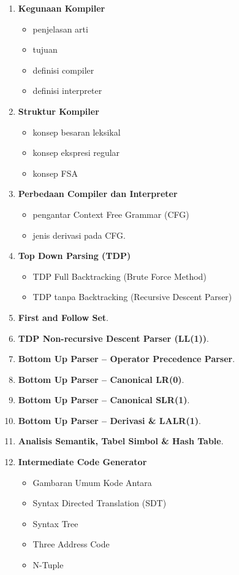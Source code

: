 \begin{enumerate}
  \item \textbf{Kegunaan Kompiler} 
     \begin{itemize}
      \item penjelasan arti
      \item tujuan
       \item definisi compiler
       \item definisi interpreter
    \end{itemize}
  \item \textbf{Struktur Kompiler} 
     \begin{itemize}
      \item konsep besaran leksikal
      \item konsep ekspresi regular
      \item konsep FSA
    \end{itemize}
  \item \textbf{Perbedaan Compiler dan Interpreter} 
       \begin{itemize}
      \item pengantar Context Free Grammar (CFG)
      \item jenis derivasi pada CFG.      
    \end{itemize}
  
  \item \textbf{Top Down Parsing (TDP)}
    \begin{itemize}
      \item TDP Full Backtracking (Brute Force Method)
      \item TDP tanpa Backtracking (Recursive Descent Parser)
    \end{itemize}
  \item \textbf{First and Follow Set}.
  \item \textbf{TDP Non-recursive Descent Parser (LL(1))}.
  \item \textbf{Bottom Up Parser – Operator Precedence Parser}.
  \item \textbf{Bottom Up Parser – Canonical LR(0)}.
  \item \textbf{Bottom Up Parser – Canonical SLR(1)}.
  \item \textbf{Bottom Up Parser – Derivasi \& LALR(1)}.
  \item \textbf{Analisis Semantik, Tabel Simbol \& Hash Table}.
  \item \textbf{Intermediate Code Generator}
    \begin{itemize}
      \item Gambaran Umum Kode Antara
      \item Syntax Directed Translation (SDT)
      \item Syntax Tree
      \item Three Address Code
      \item N-Tuple
    \end{itemize}
\end{enumerate}
